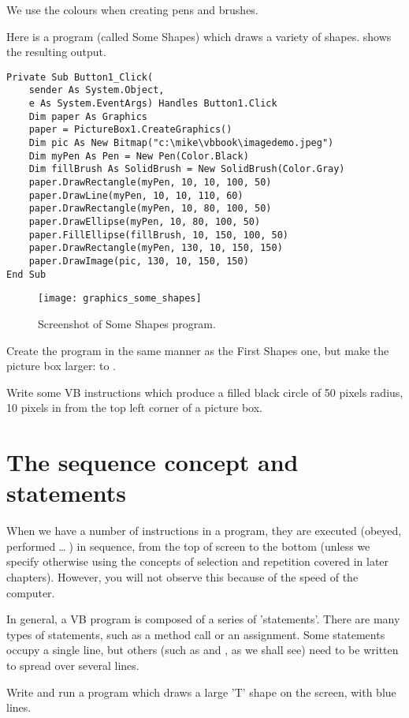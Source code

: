 		We use the colours when creating pens and brushes.
		
		Here is a program (called Some Shapes) which draws a variety of shapes.  shows the resulting output.
		\begin{lstlisting}
Private Sub Button1_Click(
	sender As System.Object, 
	e As System.EventArgs) Handles Button1.Click
	Dim paper As Graphics
	paper = PictureBox1.CreateGraphics()
	Dim pic As New Bitmap("c:\mike\vbbook\imagedemo.jpeg")
	Dim myPen As Pen = New Pen(Color.Black)
	Dim fillBrush As SolidBrush = New SolidBrush(Color.Gray)
	paper.DrawRectangle(myPen, 10, 10, 100, 50)
	paper.DrawLine(myPen, 10, 10, 110, 60)
	paper.DrawRectangle(myPen, 10, 80, 100, 50)
	paper.DrawEllipse(myPen, 10, 80, 100, 50)
	paper.FillEllipse(fillBrush, 10, 150, 100, 50)
	paper.DrawRectangle(myPen, 130, 10, 150, 150)
	paper.DrawImage(pic, 130, 10, 150, 150)
End Sub
		\end{lstlisting}

		\begin{figure}[ht]
			\centering
			\texttt{[image: graphics\_some\_shapes]}
			\caption{Screenshot of Some Shapes program.}
			\label{fig:graphics_some_shapes}
		\end{figure}


		Create the program in the same manner as the First Shapes one, but make the picture box larger: to .

		\begin{stqb}
			\begin{STQ}
				\item	Write some VB instructions which produce a filled black circle of 50 pixels radius, 10 pixels in from the top left corner of a picture box.
			\end{STQ}
		\end{stqb}
	
	\section{The sequence concept and statements}
		When we have a number of instructions in a program, they are executed (obeyed, performed … ) in sequence, from the top of screen to the bottom (unless we specify otherwise using the concepts of selection and repetition covered in later chapters). However, you will not observe this because of the speed of the computer.
		
		In general, a VB program is composed of a series of 'statements'. There are many types of statements, such as a method call or an assignment. Some statements occupy a single line, but others (such as  and , as we shall see) need to be written to spread over several lines.
		\begin{stqb}
			\begin{STQ}
				\item	Write and run a program which draws a large 'T' shape on the screen, with blue lines.
			\end{STQ}
		\end{stqb}

